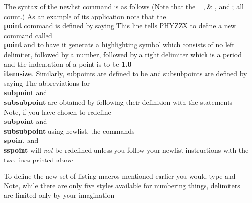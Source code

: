 The syntax of the newlist command is as follows
(Note that the =, \& , and ; all count.)
As an example of its application note that the {\bf \\point}
command is defined by saying
This line tells PHYZZX to define a new command called
{\bf \\point} and to have it generate a highlighting symbol
which consists of no left delimiter, followed by a number,
followed by a right delimiter which is a period and the indentation
of a point is to be {\bf 1.0\\itemsize}.
Similarly, subpoints are defined to be
and subsubpoints are defined by saying
The abbreviations for {\bf \\subpoint} and {\bf \\subsubpoint}
are obtained by following their definition with the
statements
\tc{\\let\\spoint=\\subpoint}
\tcon{\\let\\sspoint=\\subsubpoint}
Note, if you have chosen to redefine {\bf \\subpoint}
and {\bf \\subsubpoint} using newlist, the commands {\bf \\spoint}
and {\bf \\sspoint} will {\it not} be redefined unless you follow
your newlist instructions with the two lines printed above.
 
To define the new set of listing macros mentioned earlier you would type
and
Note, while there are only five styles available for numbering
things, delimiters are limited only by your imagination.
 
